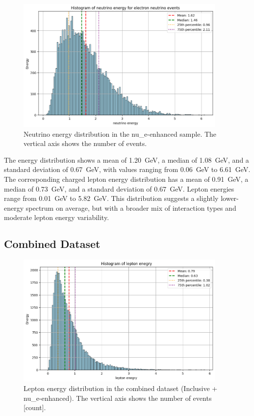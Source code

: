 \documentclass{pracalicmgr}
\begin{document}
\begin{figure}[H]
    \centering
    \includegraphics[width=0.92\textwidth]{src/neutrinoMuon.png}
    \caption{Neutrino energy distribution in the nu\_e-enhanced sample. The vertical axis shows the number of events.}
    \label{fig:neutrino-nue}
\end{figure}


The energy distribution shows a mean of 1.20~GeV, a median of 1.08~GeV, and a standard deviation of 0.67~GeV, with values ranging from 0.06~GeV to 6.61~GeV. The corresponding charged lepton energy distribution has a mean of 0.91~GeV, a median of 0.73~GeV, and a standard deviation of 0.67~GeV. Lepton energies range from 0.01~GeV to 5.82~GeV. This distribution suggests a slightly lower-energy spectrum on average, but with a broader mix of interaction types and moderate lepton energy variability.

\subsection{Combined Dataset}

\begin{figure}[h]
    \centering
    \includegraphics[width=0.92\textwidth]{src/leptonFull.png}
    \caption{Lepton energy distribution in the combined dataset (Inclusive + nu\_e-enhanced). The vertical axis shows the number of events [count].}
    \label{fig:lepton-combined}
\end{figure}
\end{document}
